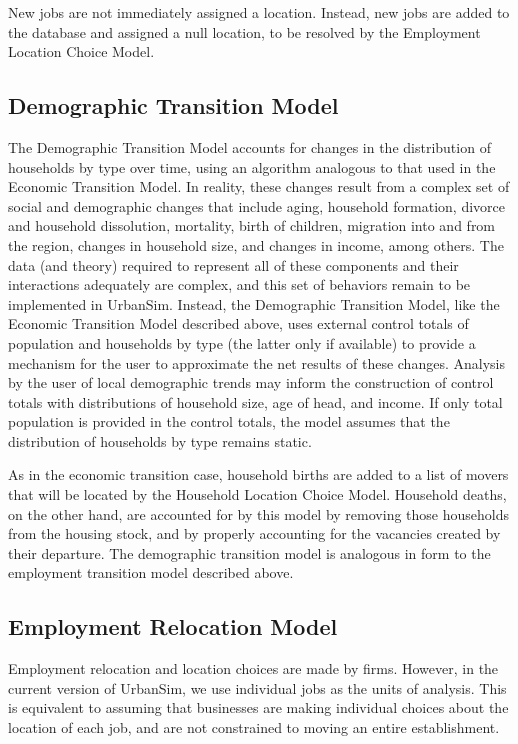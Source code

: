 New jobs are not immediately assigned a location.  Instead, new
jobs are added to the database and assigned a null location, to be
resolved by the Employment Location Choice Model.


\subsection{Demographic Transition Model}
\label{sec:model-system-demographic-transition-model}
%
The Demographic Transition Model accounts for changes in the
distribution of households by type over time, using an algorithm
analogous to that used in the Economic Transition Model.  In
reality, these changes result from a complex set of social and
demographic changes that include aging, household formation,
divorce and household dissolution, mortality, birth of children,
migration into and from the region, changes in household size, and
changes in income, among others.  The data (and theory) required
to represent all of these components and their interactions
adequately are complex, and this set of behaviors remain to be
implemented in UrbanSim. Instead, the Demographic
Transition Model, like the Economic Transition Model described
above, uses external control totals of population and households
by type (the latter only if available) to provide a mechanism for
the user to approximate the net results of these changes. Analysis
by the user of local demographic trends may inform the
construction of control totals with distributions of household
size, age of head, and income.  If only total population is
provided in the control totals, the model assumes that the
distribution of households by type remains static.

As in the economic transition case, household births are added to
a list of movers that will be located by the Household Location
Choice Model.  Household deaths, on the other hand, are accounted
for by this model by removing those households from the housing
stock, and by properly accounting for the vacancies created by
their departure.  The demographic transition model is analogous in
form to the employment transition model described above.


\subsection{Employment Relocation Model}
\label{sec:model-system-employment-relocation-model}
%
Employment relocation and location choices are made by firms.
However, in the current version of UrbanSim, we use individual
jobs as the units of analysis.  This is equivalent to assuming
that businesses are making individual choices about the location
of each job, and are not constrained to moving an entire
establishment.

